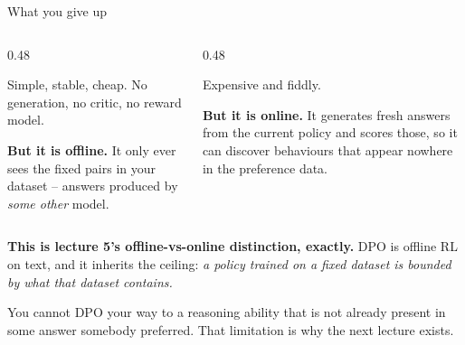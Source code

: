 \documentclass[aspectratio=169]{beamer}
\begin{document}
\begin{frame}{What you give up}
  \begin{columns}[T]
    \begin{column}{0.48\textwidth}
      \begin{tcolorbox}[colback=paramgreen!8, colframe=paramgreen, boxrule=0.6pt, arc=2pt,
                        title={\textbf{DPO}}]
        \small
        Simple, stable, cheap. No generation, no critic, no reward model.

        \vskip 4pt
        \textbf{But it is offline.} It only ever sees the fixed pairs in your dataset -- answers
        produced by \emph{some other} model.
      \end{tcolorbox}
    \end{column}
    \begin{column}{0.48\textwidth}
      \begin{tcolorbox}[colback=armblue!8, colframe=armblue, boxrule=0.6pt, arc=2pt,
                        title={\textbf{PPO / online RL}}]
        \small
        Expensive and fiddly.

        \vskip 4pt
        \textbf{But it is online.} It generates fresh answers from the current policy and scores
        those, so it can discover behaviours that appear nowhere in the preference data.
      \end{tcolorbox}
    \end{column}
  \end{columns}

  \vskip 8pt
  \begin{tcolorbox}[colback=armred!8, colframe=armred, boxrule=0.7pt, arc=2pt]
    \small
    \textbf{This is lecture 5's offline-vs-online distinction, exactly.} DPO is offline RL on
    text, and it inherits the ceiling: \emph{a policy trained on a fixed dataset is bounded by
    what that dataset contains.}

    \vskip 4pt
    You cannot DPO your way to a reasoning ability that is not already present in some answer
    somebody preferred. That limitation is why the next lecture exists.
  \end{tcolorbox}
\end{frame}
\end{document}
